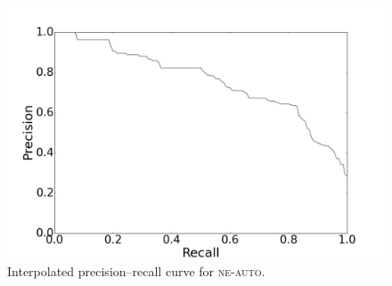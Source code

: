 \documentclass[10pt, a4paper]{article}
\begin{document}
\begin{figure}
\begin{center}
\includegraphics[scale=0.22]{pr/pr.png} 
\caption{Interpolated precision--recall curve for \textsc{ne-auto}.
\label{fig:pr}}
\end{center}
\end{figure}











\end{document}
